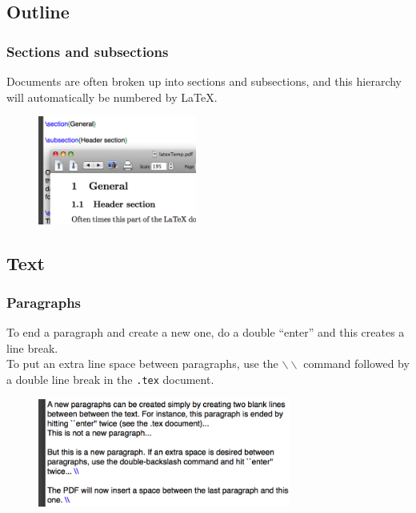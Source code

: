 \documentclass[slidestop,compress,mathserif]{beamer}
\begin{document}
\subsection[Outline]{Outline}
\begin{frame} \frametitle{Sections and subsections}
Documents are often broken up into sections and subsections, and this hierarchy will automatically be numbered by LaTeX.
\begin{figure}[htbp]
   \centering
   \includegraphics[height=1.4in]{basicsOfLatex/general/sectionsSubsections}
\end{figure}
\end{frame}

\subsection[Text]{Text}
\begin{frame} \frametitle{Paragraphs}
To end a paragraph and create a new one, do a double ``{\color{highlight}enter}'' and this creates a line break. \\
\vspace{0.5cm}
To put an extra line space between paragraphs, use the \texttt{\color{command}$\backslash\backslash$} command followed by a double line break in the \texttt{.tex} document.
\begin{figure}[htbp]
   \centering
   \includegraphics[height=1.4in]{basicsOfLatex/general/paragraphSpacing}
\end{figure}
\end{frame}
\end{document}
